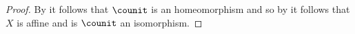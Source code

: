 
\begin{proof}
By  it follows that $\counit$ is an homeomorphism 
and so by  it follows that $X$ is affine and is $\counit$ an isomorphism.
\end{proof}